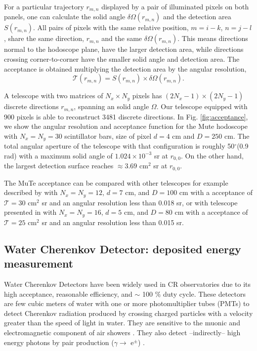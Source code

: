 \documentclass[letterpaper,11pt]{article}
\begin{document}
For a particular trajectory $r_{m,n}$ displayed by a pair of illuminated pixels on both panels, one can calculate the solid angle $\delta\Omega(r_{m,n})$ and the detection area $S(r_{m,n})$. All pairs of pixels with the same relative position, {$m=i-k$, $n=j-l$}, share the same direction, $r_{m,n}$ and the same $\delta\Omega(r_{m,n})$. This means directions normal to the hodoscope plane, have the larger detection area, while directions crossing corner-to-corner have the smaller solid angle and detection area. The acceptance is obtained \cite{LesparreEtal2010} multiplying the detection area by the angular resolution,
\begin{equation}
\mathcal{T}(r_{m,n})=S(r_{m,n})\times \delta\Omega(r_{m,n}).
\end{equation}

A telescope with two matrices of $N_x\times N_y$ pixels has $(2N_x-1)\times(2N_y-1)$ discrete directions $r_{m,n}$, spanning an solid angle $\Omega$. Our telescope equipped with 900 pixels is able to reconstruct 3481 discrete directions. In Fig. \ref{fig:acceptance}, we show the angular resolution and acceptance function for the Mute hodoscope with $N_x=N_y=30$ scintillator bars, size of pixel $d=4$ cm and $D=250$ cm. The total angular aperture of the telescope with that configuration is roughly 50$^{\circ}$(0.9 rad) with a maximum solid angle of $1.024\times 10^{-3}$ sr at $r_{0,0}$. On the other hand, the largest detection surface reaches $\approx 3.69$ cm$^{2}$ sr at $r_{0,0}$.

The MuTe acceptance can be compared with other telescopes for example described by \cite{UchidaTanakaTanaka2009space} with $N_x=N_y=12$, $d=7$ cm, and $D=100$ cm with a acceptance of $\mathcal{T}=30$ cm$^{2}$ sr and an angular resolution less than 0.018 sr, or with telescope presented in \cite{LesparreEtal2010} with $N_x=N_y=16$, $d=5$ cm, and $D=80$ cm with a acceptance of $\mathcal{T}=25$ cm$^{2}$ sr and an angular resolution less than 0.015 sr.

\subsection{Water Cherenkov Detector: deposited energy measurement}

Water Cherenkov Detectors have been widely used in CR observatories due to its high acceptance, reasonable efficiency, and $\sim$ 100 $\%$ duty cycle. These detectors are few cubic meters of water with one or more photomultiplier tubes (PMTs) to detect Cherenkov radiation produced by crossing charged particles with a velocity greater than the speed of light in water. They are sensitive to the muonic and electromagnetic component of air showers \cite{Auger2015}. They also detect --indirectly-- high energy photons by pair production ($\gamma \rightarrow$ e$^{\pm}$) \cite{allard2007detecting, allard2008use, allekotte2008surface}. 
\end{document}
